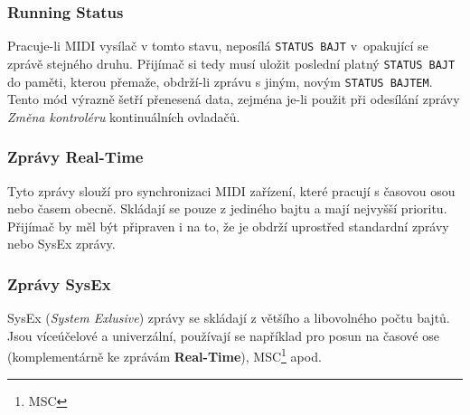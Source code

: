 \subsubsection{Running Status}
Pracuje-li \acs{MIDI} vysílač v tomto stavu, neposílá \texttt{STATUS BAJT} v~opakující se zprávě stejného druhu. Přijímač si tedy musí uložit poslední platný \texttt{STATUS BAJT} do paměti, kterou přemaže, obdrží-li zprávu s jiným, novým \texttt{STATUS BAJTEM}. Tento mód výrazně šetří přenesená data, zejména je-li použit při odesílání zprávy \emph{Změna kontroléru} kontinuálních ovladačů. \cite{MIDIspecs}

\subsubsection{Zprávy Real-Time}
Tyto zprávy slouží pro synchronizaci \acs{MIDI} zařízení, které pracují s časovou osou nebo časem obecně. Skládají se pouze z jediného bajtu a mají nejvyšší prioritu. Přijímač by měl být připraven i na to, že je obdrží uprostřed standardní zprávy nebo SysEx zprávy. \cite{MIDIspecs}

\subsubsection{Zprávy SysEx}
SysEx (\emph{System Exlusive}) zprávy se skládají z většího a libovolného počtu bajtů. Jsou víceúčelové a univerzální, používají se například pro posun na časové ose (komplementárně ke zprávám \textbf{Real-Time}), \acs{MSC}\footnote{\acl{MSC}} apod. \cite{MIDIspecs}

%